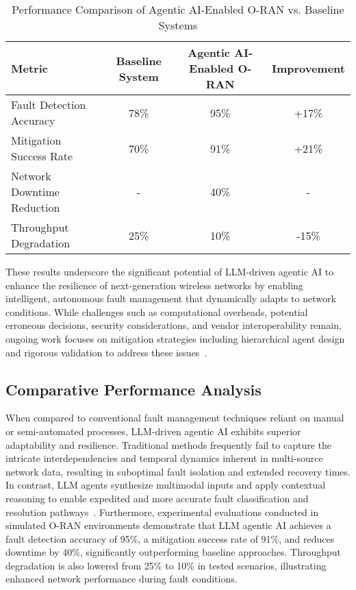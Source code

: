 \documentclass[sigconf]{acmart}
\begin{document}
\begin{table*}[htbp]
\centering
\caption{Performance Comparison of Agentic AI-Enabled O-RAN vs. Baseline Systems}
\label{tab:performance_comparison}
\begin{adjustbox}{max width=\textwidth}
\begin{tabular}{@{}lccc@{}}
\toprule
Metric & Baseline System & Agentic AI-Enabled O-RAN & Improvement \\
\midrule
Fault Detection Accuracy & 78\% & 95\% & +17\% \\
Mitigation Success Rate & 70\% & 91\% & +21\% \\
Network Downtime Reduction & - & 40\% & - \\
Throughput Degradation & 25\% & 10\% & -15\% \\
\bottomrule
\end{tabular}
\end{adjustbox}
\end{table*}

These results underscore the significant potential of LLM-driven agentic AI to enhance the resilience of next-generation wireless networks by enabling intelligent, autonomous fault management that dynamically adapts to network conditions. While challenges such as computational overheads, potential erroneous decisions, security considerations, and vendor interoperability remain, ongoing work focuses on mitigation strategies including hierarchical agent design and rigorous validation to address these issues~\cite{ref55}.

\subsection{Comparative Performance Analysis}

When compared to conventional fault management techniques reliant on manual or semi-automated processes, LLM-driven agentic AI exhibits superior adaptability and resilience. Traditional methods frequently fail to capture the intricate interdependencies and temporal dynamics inherent in multi-source network data, resulting in suboptimal fault isolation and extended recovery times. In contrast, LLM agents synthesize multimodal inputs and apply contextual reasoning to enable expedited and more accurate fault classification and resolution pathways~\cite{ref55}. Furthermore, experimental evaluations conducted in simulated O-RAN environments demonstrate that LLM agentic AI achieves a fault detection accuracy of 95\%, a mitigation success rate of 91\%, and reduces downtime by 40\%, significantly outperforming baseline approaches. Throughput degradation is also lowered from 25\% to 10\% in tested scenarios, illustrating enhanced network performance during fault conditions.
\end{document}
